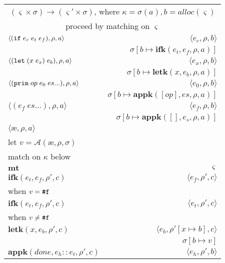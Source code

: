 \documentclass[12pt,draft]{article}
\newcommand\mae{\ensuremath{\text{\ae}}}
\begin{document}
\begin{center}
\begin{tabular}{@{}l | r@{}}
\multicolumn{2}{c}{$(\varsigma \times \sigma) \rightarrow (\varsigma' \times \sigma)$, 
where $\kappa = \sigma(a) , b = alloc(\varsigma) $} \\
\multicolumn{2}{c}{proceed by matching on $\varsigma$} \\
\hline\hline
$\langle
(\texttt{if}\;e_c\;e_t\;e_f) , \rho , a
\rangle$
&$\langle
e_c , \rho , b 
\rangle$ \\
& $\sigma[b \mapsto \textbf{ifk}(e_t , e_f , \rho , a)]$ \\
\hline
$\langle
(\texttt{let}\;(x\;e_x)\;e_b) , \rho , a
\rangle$
&$\langle
e_x , \rho , b
\rangle$ \\
& $\sigma[b \mapsto \textbf{letk}(x , e_b , \rho , a)]$ \\
\hline
$\langle
(\texttt{prim}\;op\;e_0\;es ...) , \rho , a
\rangle$
&$\langle
e_0 , \rho , b
\rangle$ \\
& $\sigma[b \mapsto \textbf{appk}([op] ,  es , \rho , a)]$ \\
\hline
$\langle
(e_f \; es ...) , \rho , a
\rangle$
&$\langle
e_f , \rho , b
\rangle$ \\
& $\sigma[b \mapsto \textbf{appk}([] , e_s , \rho , a)]$ \\
\hline
$\langle \mae , \rho , a \rangle$ & \\
let $v = \mathcal{A}(\mae, \rho, \sigma)$ \\
match on $\kappa$ below \\
\hline
$ \textbf{mt}$ & $\varsigma$ \\
\hline
$ \textbf{ifk}(e_t , e_f , \rho' , c) $ 
& $\langle e_f , \rho' , c \rangle$ \\
when $v = \texttt{\#f}$ & \\
\hline
$ \textbf{ifk}(e_t , e_f , \rho' , c) $ 
& $\langle e_t , \rho' , c \rangle$ \\
when $v \not= \texttt{\#f}$ & \\
\hline
$ \textbf{letk}(x , e_b , \rho' , c) $
& $\langle e_b , \rho'[x \mapsto b] , c \rangle$ \\
& $ \sigma[b \mapsto v] $ \\
\hline
$ \textbf{appk}(done, e_h::e_t , \rho' , c) $
& $\langle e_h , \rho' , b \rangle$ \\

\end{tabular}
\end{center}
\end{document}
